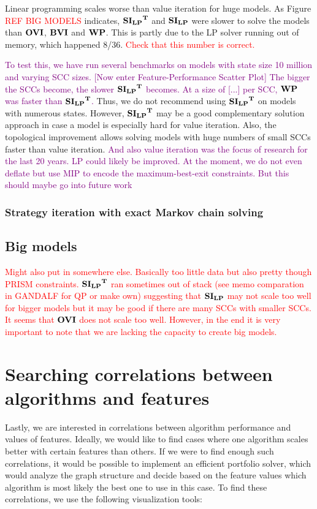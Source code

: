 Linear programming scales worse than value iteration for huge models.
As Figure \textcolor{red}{REF BIG MODELS} indicates, $\mathbf{\mathbf{SI_{LP}}^T}$ and $\mathbf{SI_{LP}}$ were slower to solve the models than $\mathbf{OVI}$, $\mathbf{BVI}$ and $\mathbf{WP}$.
This is partly due to the LP solver running out of memory, which happened 8/36. \textcolor{red}{Check that this number is correct.}

\textcolor{purple}{To test this, we have 
run several benchmarks on models with state size 10 million and varying SCC sizes. [Now enter Feature-Performance Scatter Plot] 
The bigger the SCCs become, the slower $\mathbf{\mathbf{SI_{LP}}^T}$ becomes. At a size of [...] per SCC, $\mathbf{WP}$ was faster than $\mathbf{\mathbf{SI_{LP}}^T}$.}
Thus, we do not recommend using $\mathbf{\mathbf{SI_{LP}}^T}$ on models with numerous states.
However, $\mathbf{\mathbf{SI_{LP}}^T}$ may be a good complementary solution approach in case a model is especially hard for value iteration.
Also, the topological improvement allows solving models with huge numbers of small SCCs faster than value iteration.
\textcolor{purple}{And also value iteration was the focus of research for the last 20 years. 
LP could likely be improved. At the moment, we do not even deflate but use MIP to encode the maximum-best-exit constraints. But this should maybe go into future work}

\subsubsection*{Strategy iteration with exact Markov chain solving}


\subsection{Big models}
\textcolor{red}{Might also put in somewhere else. Basically too little data but also pretty though PRISM constraints.
$\mathbf{\mathbf{SI_{LP}}^T}$ ran sometimes out of stack (see memo comparation in GANDALF for QP or make own) suggesting that $\mathbf{SI_{LP}}$ may not scale too well 
for bigger models but it may be good if there are many SCCs with smaller SCCs.
It seems that $\mathbf{OVI}$ does not scale too well. However, in the end it is very important to note that we are lacking the capacity to create
big models.}


\iffalse
\section{Searching correlations between algorithms and features}
Lastly, we are interested in correlations between algorithm performance and values of features.
Ideally, we would like to find cases where one algorithm scales better with certain features than others.
If we were to find enough such correlations, it would be possible to implement an efficient portfolio solver, which
would analyze the graph structure and decide based on the feature values which algorithm is most likely the best one to use in this case.
To find these correlations, we use the following visualization tools:

